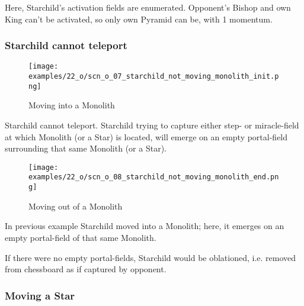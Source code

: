 Here, Starchild's activation fields are enumerated. Opponent's Bishop and own King
can't be activated, so only own Pyramid can be, with 1 momentum.

\clearpage %

\subsubsection*{Starchild cannot teleport}
\label{sec:One/Starchild/Movement/Starchild cannot teleport}

\noindent
\begin{wrapfigure}[6]{l}{0.4\textwidth}
\centering
\texttt{[image: examples/22\_o/scn\_o\_07\_starchild\_not\_moving\_monolith\_init.png]}
\caption{Moving into a Monolith}
\label{fig:scn_o_07_starchild_not_moving_monolith_init}
\end{wrapfigure}
Starchild cannot teleport. Starchild trying to capture either step- or miracle-field
at which Monolith (or a Star) is located, will emerge on an empty portal-field
surrounding that same Monolith (or a Star).

\vspace*{5.1\baselineskip}
\noindent
\begin{wrapfigure}[8]{l}{0.4\textwidth}
\centering
\texttt{[image: examples/22\_o/scn\_o\_08\_starchild\_not\_moving\_monolith\_end.png]}
\caption{Moving out of a Monolith}
\label{fig:scn_o_08_starchild_not_moving_monolith_end}
\end{wrapfigure}
In previous example Starchild moved into a Monolith; here, it emerges on an empty
portal-field of that same Monolith.

If there were no empty portal-fields, Starchild would be oblationed, i.e. removed
from chessboard as if captured by opponent.

\clearpage %

\subsubsection*{Moving a Star}
\label{sec:One/Starchild/Movement/Moving a Star}

